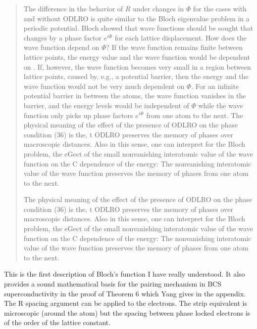 \begin{quote}
The difference in the behavior of $R$ under changes in $\Phi$ for the cases 
with and without ODLRO is quite similar to the Bloch eigenvalue problem
in a periodic potential. Bloch showed that wave functions should be sought 
that changes by a phase factor $e^{i\Phi}$ for each lattice displacement. How does the 
wave function depend on $\Phi$? If the wave function remains finite between lattice points, 
the energy value and the wave function would be dependent on \Phi. If, however, 
the wave function becomes very small in a region between lattice points, 
caused by, e.g., a potential barrier, then the energy and the wave function 
would not be very much dependent on $\Phi$. For an infinite potential barrier in 
between the atoms, the wave function vanishes in the barrier, and the energy 
levels would be independent of $\Phi$ while the
wave function only picks up phase factors $e^{i\Phi}$ from one atom to the next.
The physical meaning of the effect of the presence of ODLRO on the 
phase condition (36) is the, t ODLRO preserves the memory of phases over 
macroscopic distances. Also in this sense, one can interpret for the 
Bloch problem, the eGect of the small nonvanishing interatomic 
value of the wave function on the C dependence of the energy: 
The nonvanishing interatomic value of the wave function preserves the 
memory of phases from one atom to the next.

The physical meaning of the effect of the presence of ODLRO on the 
phase condition (36) is the, t ODLRO preserves the memory of phases over 
macroscopic distances. Also in this sense, one can interpret for the 
Bloch problem, the eGect of the small nonvanishing interatomic value of the 
wave function on the C dependence of the energy: The nonvanishing interatomic 
value of the wave function preserves the memory of phases from one atom to the next.
\end{quote}

This is the first description of Bloch's function I have really understood. 
It also provides a sound mathematical basis for the pairing mechanism in BCS
superconductivity in the proof of Theorem 6 which Yang gives in the appendix.
The R spacing argument can be applied to the electrons. The strip equivalent
is microscopic (around the atom) but the spacing between phase locked electrons
is of the order of the lattice constant.



